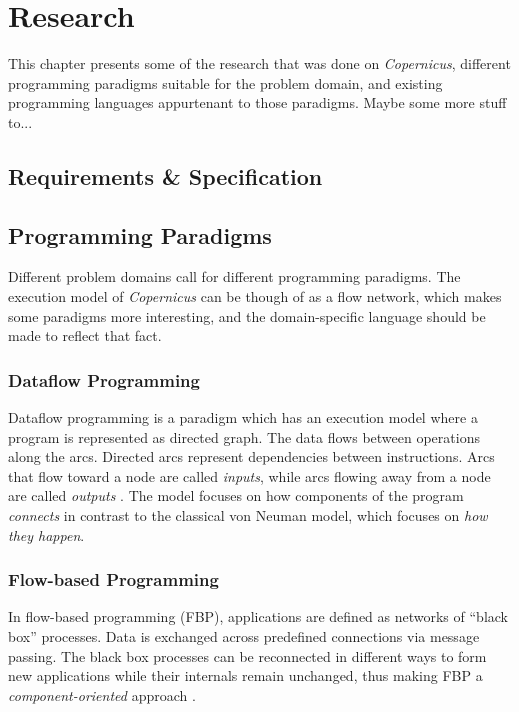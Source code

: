 \chapter{Research}\label{chap:research}
This chapter presents some of the research that was done on
\emph{Copernicus}, different programming paradigms suitable for the
problem domain, and existing programming languages appurtenant to
those paradigms. Maybe some more stuff to...



\section{Requirements \& Specification}


\section{Programming Paradigms}
Different problem domains call for different programming
paradigms. The execution model of \emph{Copernicus} can be though of
as a flow network, which makes some paradigms more interesting, and
the domain-specific language should be made to reflect that fact.


\subsection{Dataflow Programming}
Dataflow programming is a paradigm which has an execution model where
a program is represented as directed graph. The data flows between
operations along the arcs. Directed arcs represent dependencies
between instructions. Arcs that flow toward a node are called
\emph{inputs}, while arcs flowing away from a node are called
\emph{outputs} \citep{johnston:2004}. The model focuses on how
components of the program \emph{connects} in contrast to the classical
von Neuman model, which focuses on \emph{how they happen}.


\subsection{Flow-based Programming}
In flow-based programming (FBP), applications are defined as networks
of ``black box'' processes. Data is exchanged across predefined
connections via message passing. The black box processes can be
reconnected in different ways to form new applications while their
internals remain unchanged, thus making FBP a
\emph{component-oriented} approach
\citep{morrison:2010,morrison:online}.



